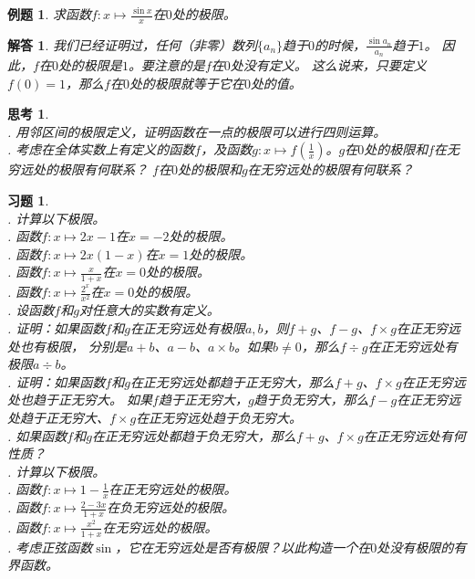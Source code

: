 \documentclass[12pt,UTF8]{ctexbook}
\newtheorem{et}{例题}[section]
\newtheorem{sk}{思考}[section]
\newtheorem*{so}{解答}
\newtheorem{xt}{习题}[section]
\begin{document}
\begin{et}
    求函数$f:x\mapsto \frac{\sin{x}}{x}$在$0$处的极限。
\end{et}
\begin{so}
    我们已经证明过，任何（非零）数列$\{a_n\}$趋于$0$的时候，$\frac{\sin{a_n}}{a_n}$趋于$1$。
    因此，$f$在$0$处的极限是$1$。要注意的是$f$在$0$处没有定义。
    这么说来，只要定义$f(0) = 1$，那么$f$在$0$处的极限就等于它在$0$处的值。
\end{so}

\begin{sk}
    \mbox{} \\
    . 用邻区间的极限定义，证明函数在一点的极限可以进行四则运算。\\
    . 考虑在全体实数上有定义的函数$f$，及函数$g:x\mapsto f\left(\frac{1}{x}\right)$。$g$在$0$处的极限和$f$在无穷远处的极限有何联系？
    $f$在$0$处的极限和$g$在无穷远处的极限有何联系？
\end{sk}

\begin{xt}
    \mbox{} \\
    . 计算以下极限。\\
    . 函数$f:x\mapsto 2x - 1$在$x = -2$处的极限。\\
    . 函数$f:x\mapsto 2x(1 - x)$在$x = 1$处的极限。\\
    . 函数$f:x\mapsto \frac{x}{1 + x}$在$x = 0$处的极限。\\
    . 函数$f:x\mapsto \frac{2^x}{x^2}$在$x = 0$处的极限。\\
    . 设函数$f$和$g$对任意大的实数有定义。\\
    . 证明：如果函数$f$和$g$在正无穷远处有极限$a, b$，则$f + g$、$f - g$、$f \times g$在正无穷远处也有极限，
    分别是$a + b$、$a - b$、$a \times b$。如果$b\neq 0$，那么$f \div g$在正无穷远处有极限$a \div b$。\\
    . 证明：如果函数$f$和$g$在正无穷远处都趋于正无穷大，那么$f + g$、$f \times g$在正无穷远处也趋于正无穷大。
    如果$f$趋于正无穷大，$g$趋于负无穷大，那么$f - g$在正无穷远处趋于正无穷大、$f \times g$在正无穷远处趋于负无穷大。\\
    . 如果函数$f$和$g$在正无穷远处都趋于负无穷大，那么$f + g$、$f \times g$在正无穷远处有何性质？\\
    . 计算以下极限。\\
    . 函数$f:x\mapsto 1 - \frac{1}{x}$在正无穷远处的极限。\\
    . 函数$f:x\mapsto \frac{2 - 3x}{1 + x}$在负无穷远处的极限。\\
    . 函数$f:x\mapsto \frac{x^2}{1 + x}$在无穷远处的极限。\\
    . 考虑正弦函数$\sin$，它在无穷远处是否有极限？以此构造一个在$0$处没有极限的有界函数。
\end{xt}
\end{document}
